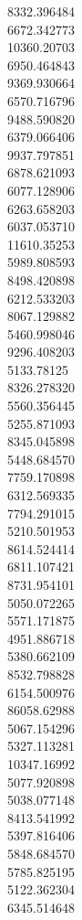 8332.396484\\
6672.342773\\
10360.20703\\
6950.464843\\
9369.930664\\
6570.716796\\
9488.590820\\
6379.066406\\
9937.797851\\
6878.621093\\
6077.128906\\
6263.658203\\
6037.053710\\
11610.35253\\
5989.808593\\
8498.420898\\
6212.533203\\
8067.129882\\
5460.998046\\
9296.408203\\
5133.78125\\
8326.278320\\
5560.356445\\
5255.871093\\
8345.045898\\
5448.684570\\
7759.170898\\
6312.569335\\
7794.291015\\
5210.501953\\
8614.524414\\
6811.107421\\
8731.954101\\
5050.072265\\
5571.171875\\
4951.886718\\
5380.662109\\
8532.798828\\
6154.500976\\
86058.62988\\
5067.154296\\
5327.113281\\
10347.16992\\
5077.920898\\
5038.077148\\
8413.541992\\
5397.816406\\
5848.684570\\
5785.825195\\
5122.362304\\
6345.514648\\
